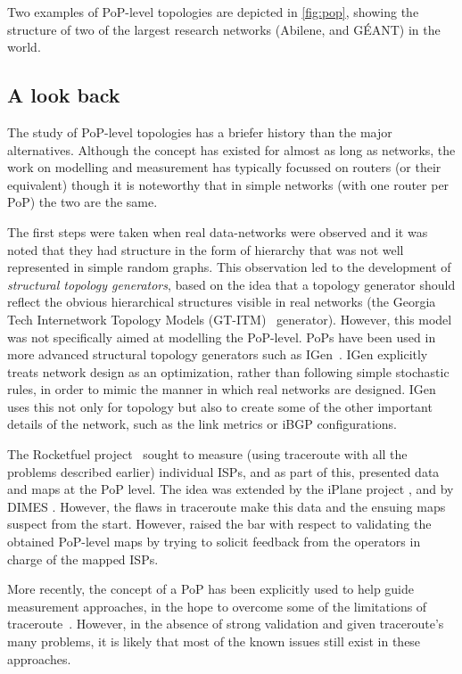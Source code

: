 Two examples of PoP-level topologies are depicted in \autoref{fig:pop}, 
showing the structure of two of the largest research networks (Abilene, 
and G\'{E}ANT) in the world. 

\subsection{A look back}

The study of PoP-level topologies has a briefer history than the major 
alternatives. Although the concept has existed for almost as long as networks, 
the work on modelling and measurement has typically focussed on routers (or 
their equivalent) though it is noteworthy that in simple networks (with one 
router per PoP) the two are the same. 

The first steps were taken when real data-networks were observed and
it was noted that they had structure in the form of hierarchy that was
not well represented in simple random graphs.  This observation led to
the development of \emph{structural topology
  generators}\cite{Zegura97}, based on the idea that a topology
generator should reflect the obvious hierarchical structures visible
in real networks (\eg the Georgia Tech Internetwork Topology Models
(GT-ITM)~\cite{GTITM} generator). However, this model was not
specifically aimed at modelling the PoP-level.  PoPs have been used in
more advanced structural topology generators such as
IGen~\cite{quoitin09:_igen}. IGen explicitly treats network design as
an optimization, rather than following simple stochastic rules, in
order to mimic the manner in which real networks are designed.  IGen
uses this not only for topology but also to create some of the other
important details of the network, such as the link metrics or iBGP
configurations.

The Rocketfuel project~\cite{rocketfuel_1} sought to measure (using traceroute 
with all the problems described earlier) individual ISPs, and as part of this, 
presented data and maps at the PoP level. The idea was extended by the iPlane 
project \cite{iPlane}, and by DIMES
\cite{Shavitt:2012:GIP:2238856.2238872}. However, the flaws in
traceroute make this data and the ensuing maps suspect from the start. 
However, \cite{rocketfuel_1} raised the bar with respect to validating the 
obtained PoP-level maps by trying to solicit feedback from the operators in 
charge of the mapped ISPs. 

More recently, the concept of a PoP has been explicitly used to help
guide measurement approaches, in the hope to overcome some of the
limitations of traceroute~\cite{Feldman08,Yoshida09,Shavitt10}.
However, in the absence of strong validation and given traceroute's
many problems, it is likely that most of the known issues still exist
in these approaches.

